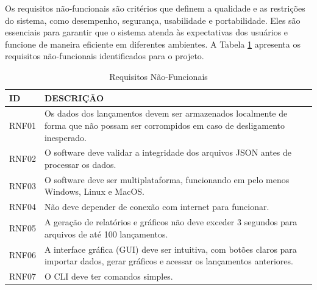 
\begin{samepage}
Os requisitos não-funcionais são critérios que definem a qualidade e as restrições do sistema, como desempenho, segurança, usabilidade e portabilidade. Eles são essenciais para garantir que o sistema atenda às expectativas dos usuários e funcione de maneira eficiente em diferentes ambientes. A Tabela \ref{tab:requisitos_nao_funcionais} apresenta os requisitos não-funcionais identificados para o projeto.

\begin{table}[htpb]
\centering
\scriptsize
\setlength{\tabcolsep}{4pt}
\caption{Requisitos Não-Funcionais}
\begin{tabular}{|l|p{11cm}|}
\hline
\textbf{ID} & \textbf{DESCRIÇÃO} \\
\hline
RNF01 & Os dados dos lançamentos devem ser armazenados localmente de forma que não possam ser corrompidos em caso de desligamento inesperado. \\
\hline
RNF02 & O software deve validar a integridade dos arquivos JSON antes de processar os dados. \\
\hline
RNF03 & O software deve ser multiplataforma, funcionando em pelo menos Windows, Linux e MacOS. \\
\hline
RNF04 & Não deve depender de conexão com internet para funcionar. \\
\hline
RNF05 & A geração de relatórios e gráficos não deve exceder 3 segundos para arquivos de até 100 lançamentos. \\
\hline
RNF06 & A interface gráfica (GUI) deve ser intuitiva, com botões claros para importar dados, gerar gráficos e acessar os lançamentos anteriores. \\
\hline
RNF07 & O CLI deve ter comandos simples. \\
\hline
\end{tabular}
\label{tab:requisitos_nao_funcionais}
\end{table}
\end{samepage}



